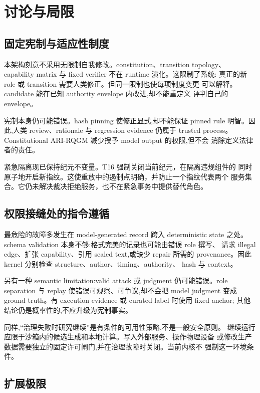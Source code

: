 \section{讨论与局限}\label{sec:discussion}

\subsection{固定宪制与适应性制度}\label{sec:discussion:p2}

本架构刻意不采用无限制自我修改。constitution、transition topology、
capability matrix 与 fixed verifier 不在 runtime 演化。这限制了系统:
真正的新 role 或 transition 需要人类修正。但同一限制也使每项制度变更
可以解释。candidate 能在已知 authority envelope 内改进,却不能重定义
评判自己的 envelope。

宪制本身仍可能错误。hash pinning 使修正显式,却不能保证 pinned rule
明智。因此,人类 review、rationale 与 regression evidence 仍属于 trusted
process。Constitutional ARI-RQGM 减少授予 model output 的权限,但不会
消除定义法律者的责任。

紧急隔离现已保持纪元不变量。T16 强制关闭当前纪元，在隔离违规组件的
同时原子地开启新指纹。这使重放中的遏制点明确，并防止一个指纹代表两个
服务集合。它仍未解决裁决拒绝服务，也不在紧急事务中提供替代角色。

\subsection{权限接缝处的指令遵循}\label{sec:discussion:seams}

最危险的故障多发生在 model-generated record 跨入 deterministic state
之处。schema validation 本身不够:格式完美的记录也可能由错误 role 撰写、
请求 illegal edge、扩张 capability、引用 sealed text,或缺少 repair 所需的
provenance。因此 kernel 分别检查 structure、author、timing、authority、
hash 与 context。

另有一种 semantic limitation:valid attack 或 judgment 仍可能错误。role
separation 与 replay 使错误可观察、可争议,却不会把 model judgment 变成
ground truth。有 execution evidence 或 curated label 时使用 fixed anchor;
其他结论仍是概率性的,不应升级为宪制事实。

同样,“治理失败时研究继续”是有条件的可用性策略,不是一般安全原则。
继续运行应限于沙箱内的候选生成和本地计算。写入外部服务、操作物理设备
或修改生产数据需要独立的固定许可闸门,并在治理故障时关闭。当前内核不
强制这一环境条件。

\subsection{扩展极限}\label{sec:discussion:scaling}

